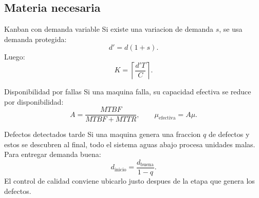 \subsection{Materia necesaria}

\begin{formulas}{Kanban con demanda variable}
Si existe una variacion de demanda \(s\), se usa demanda protegida:
\[
d'=d(1+s).
\]
Luego:
\[
K=\left\lceil\frac{d'T}{C}\right\rceil.
\]
\end{formulas}

\begin{definicion}{Disponibilidad por fallas}
Si una maquina falla, su capacidad efectiva se reduce por disponibilidad:
\[
A=\frac{MTBF}{MTBF+MTTR},
\qquad
\mu_{\text{efectiva}}=A\mu.
\]
\end{definicion}

\begin{algoritmo}{Defectos detectados tarde}
Si una maquina genera una fraccion \(q\) de defectos y estos se descubren al final, todo el sistema aguas abajo procesa unidades malas. Para entregar demanda buena:
\[
d_{\text{inicio}}=\frac{d_{\text{buena}}}{1-q}.
\]
El control de calidad conviene ubicarlo justo despues de la etapa que genera los defectos.
\end{algoritmo}
